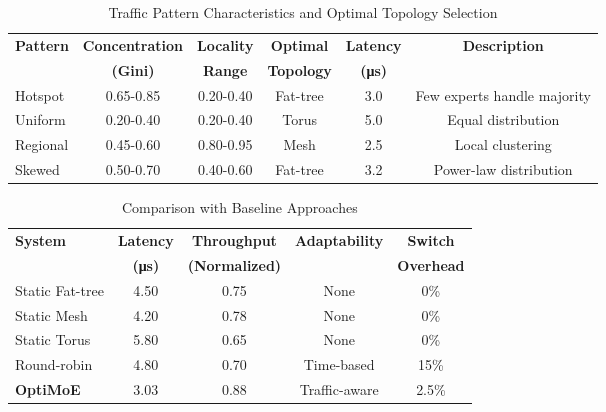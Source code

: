 \begin{table*}[t]
\centering
\caption{Traffic Pattern Characteristics and Optimal Topology Selection}
\label{tab:patterns}
\begin{tabular}{lccccc}
\toprule
\textbf{Pattern} & \textbf{Concentration} & \textbf{Locality} & \textbf{Optimal} & \textbf{Latency} & \textbf{Description} \\
 & \textbf{(Gini)} & \textbf{Range} & \textbf{Topology} & \textbf{(μs)} & \\
\midrule
Hotspot & 0.65-0.85 & 0.20-0.40 & Fat-tree & 3.0 & Few experts handle majority \\
Uniform & 0.20-0.40 & 0.20-0.40 & Torus & 5.0 & Equal distribution \\
Regional & 0.45-0.60 & 0.80-0.95 & Mesh & 2.5 & Local clustering \\
Skewed & 0.50-0.70 & 0.40-0.60 & Fat-tree & 3.2 & Power-law distribution \\
\bottomrule
\end{tabular}
\end{table*}

\begin{table}[h]
\centering
\caption{Comparison with Baseline Approaches}
\label{tab:comparison}
\begin{tabular}{lcccc}
\toprule
\textbf{System} & \textbf{Latency} & \textbf{Throughput} & \textbf{Adaptability} & \textbf{Switch} \\
 & \textbf{(μs)} & \textbf{(Normalized)} & & \textbf{Overhead} \\
\midrule
Static Fat-tree & 4.50 & 0.75 & None & 0\% \\
Static Mesh & 4.20 & 0.78 & None & 0\% \\
Static Torus & 5.80 & 0.65 & None & 0\% \\
Round-robin & 4.80 & 0.70 & Time-based & 15\% \\
\textbf{OptiMoE} & 3.03 & 0.88 & Traffic-aware & 2.5\% \\
\bottomrule
\end{tabular}
\end{table}

